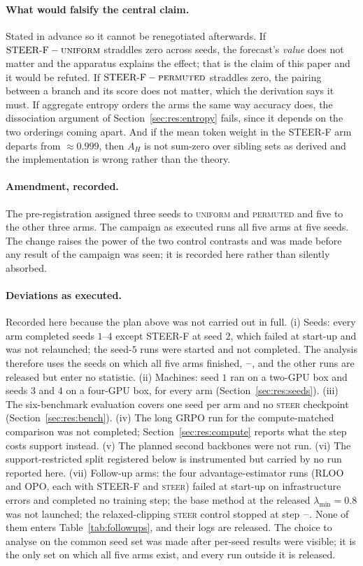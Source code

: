 \documentclass[11pt]{article}
\newcommand{\AH}{A_{H}}
\providecommand{\PENDING}{\textcolor{red}{\textbf{--}}}
\newcommand{\num}[1]{\ifcsname #1\endcsname\csname #1\endcsname\else\PENDING\fi}
\begin{document}
\paragraph{What would falsify the central claim.} Stated in advance so it cannot be
renegotiated afterwards. If $\text{STEER-F} - \textsc{uniform}$ straddles zero across
seeds, the forecast's \emph{value} does not matter and the apparatus explains the
effect; that is the claim of this paper and it would be refuted. If $\text{STEER-F} -
\textsc{permuted}$ straddles zero, the pairing between a branch and its score does
not matter, which the derivation says it must. If aggregate entropy orders the arms
the same way accuracy does, the dissociation argument of
Section~\ref{sec:res:entropy} fails, since it depends on the two orderings coming
apart. And if the mean token weight in the STEER-F arm departs from $\approx 0.999$,
then $\AH$ is not sum-zero over sibling sets as derived and the implementation is
wrong rather than the theory.

\paragraph{Amendment, recorded.} The pre-registration assigned three seeds to
\textsc{uniform} and \textsc{permuted} and five to the other three arms. The campaign
as executed runs all five arms at five seeds. The change raises the power of the two
control contrasts and was made before any result of the campaign was seen; it is
recorded here rather than silently absorbed.

\paragraph{Deviations as executed.} Recorded here because the plan above was
not carried out in full. (i) Seeds: every arm completed seeds $1$--$4$ except
STEER-F at seed $2$, which failed at start-up and was not relaunched; the seed-$5$
runs were started and not completed. The analysis therefore uses the seeds on which
all five arms finished, $\num{Seedset}$, and the other runs are released but enter
no statistic. (ii) Machines: seed $1$ ran on a two-GPU box and seeds $3$ and $4$ on a
four-GPU box, for every arm (Section~\ref{sec:res:seeds}). (iii) The six-benchmark
evaluation covers one seed per arm and no \textsc{steer} checkpoint
(Section~\ref{sec:res:bench}). (iv) The long GRPO run for the compute-matched
comparison was not completed; Section~\ref{sec:res:compute} reports what the step
costs support instead. (v) The planned second backbones were not run. (vi) The
support-restricted split registered below is instrumented but carried by no run
reported here. (vii) Follow-up arms: the four advantage-estimator runs (RLOO and
OPO, each with STEER-F and \textsc{steer}) failed at start-up on infrastructure
errors and completed no training step; the base method at the released
$\lambda_{\min} = 0.8$ was not launched; the relaxed-clipping \textsc{steer} control
stopped at step $\num{Rxclipsteerlaststep}$. None of them enters
Table~\ref{tab:followups}, and their logs are released. The choice to analyse on the common seed set was made after
per-seed results were visible; it is the only set on which all five arms exist, and
every run outside it is released.
\end{document}
